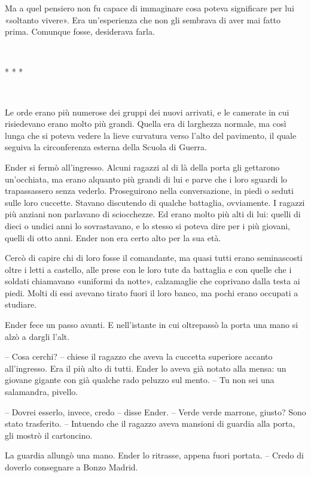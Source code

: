 {Ma a quel pensiero non fu capace di immaginare cosa poteva significare
	per lui «soltanto vivere». Era un'esperienza che non gli sembrava di
	aver mai fatto prima. Comunque fosse, desiderava farla.}

{~}

\begin{center}
	{* * *}
\end{center}

{~}

{Le orde erano più numerose dei gruppi dei nuovi arrivati, e le camerate
	in cui risiedevano erano molto più grandi. Quella era di larghezza
	normale, ma così lunga che si poteva vedere la lieve curvatura verso
	l'alto del pavimento, il quale seguiva la circonferenza esterna della
	Scuola di Guerra.}

{Ender si fermò all'ingresso. Alcuni ragazzi al di là della porta gli
	gettarono un'occhiata, ma erano alquanto più grandi di lui e parve che i
	loro sguardi lo trapassassero senza vederlo. Proseguirono nella
	conversazione, in piedi o seduti sulle loro cuccette. Stavano discutendo
	di qualche battaglia, ovviamente. I ragazzi più anziani non parlavano di
	sciocchezze. Ed erano molto più alti di lui: quelli di dieci o undici
	anni lo sovrastavano, e lo stesso si poteva dire per i più giovani,
	quelli di otto anni. Ender non era certo alto per la sua età.}

{Cercò di capire chi di loro fosse il comandante, ma quasi tutti erano
	seminascosti oltre i letti a castello, alle prese con le loro tute da
	battaglia e con quelle che i soldati chiamavano «uniformi da notte»,
	calzamaglie che coprivano dalla testa ai piedi. Molti di essi avevano
	tirato fuori il loro banco, ma pochi erano occupati a studiare.}

{Ender fece un passo avanti. E nell'istante in cui oltrepassò la porta
	una mano si alzò a dargli l'alt.}

{-- Cosa cerchi? -- chiese il ragazzo che aveva la cuccetta superiore
	accanto all'ingresso. Era il più alto di tutti. Ender lo aveva già
	notato alla mensa: un giovane gigante con già qualche rado peluzzo sul
	mento. -- Tu non sei una salamandra, pivello.}

{-- Dovrei esserlo, invece, credo -- disse Ender. -- Verde verde
	marrone, giusto? Sono stato trasferito. -- Intuendo che il ragazzo aveva
	mansioni di guardia alla porta, gli mostrò il cartoncino.}

{La guardia allungò una mano. Ender lo ritrasse, appena fuori portata.
	-- Credo di doverlo consegnare a Bonzo Madrid.}

